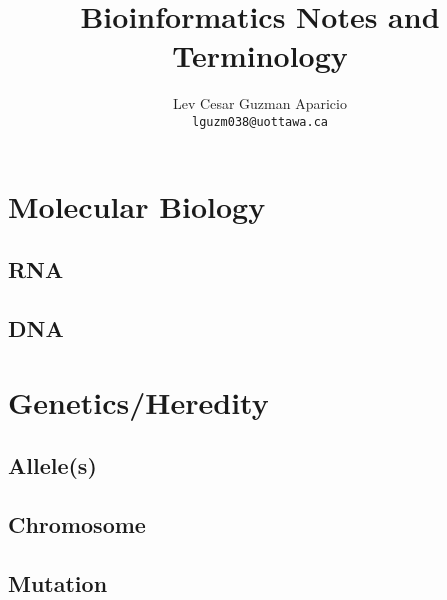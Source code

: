 \documentclass[12pt, lettersize]{article}
\title{Bioinformatics Notes and Terminology}
\author{Lev Cesar Guzman Aparicio \\ \texttt{lguzm038@uottawa.ca}}
\begin{document}
\maketitle

\section{Molecular Biology}
\subsection{RNA}

\subsection{DNA}

\section{Genetics/Heredity}

\subsection{Allele(s)}

\subsection{Chromosome }

\subsection{Mutation}
\end{document}
